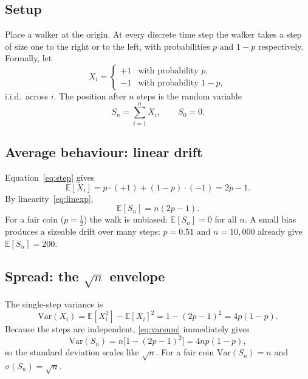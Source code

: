 \documentclass[conference,a4paper,10pt]{IEEEtran}
\begin{document}
\subsection{Setup}
Place a walker at the origin. At every discrete time step the walker takes
a step of size one to the right or to the left, with probabilities
$p$ and $1-p$ respectively. Formally, let
\begin{equation}
X_{i}=
\begin{cases}
+1 & \text{with probability } p, \\
-1 & \text{with probability } 1-p,
\end{cases}
\label{eq:step}
\end{equation}
i.i.d.\ across $i$. The position after $n$ steps is the random variable
\begin{equation}
S_{n}=\sum_{i=1}^{n}X_{i},\qquad S_{0}=0.
\label{eq:Sn}
\end{equation}

\subsection{Average behaviour: linear drift}
Equation~\eqref{eq:step} gives
\begin{equation}
\mathbb{E}[X_{i}]=p\cdot(+1)+(1-p)\cdot(-1)=2p-1.
\label{eq:Estep}
\end{equation}
By linearity~\eqref{eq:linexp},
\begin{equation}
\mathbb{E}[S_{n}]=n(2p-1).
\label{eq:ESn}
\end{equation}
For a fair coin ($p=\tfrac{1}{2}$) the walk is unbiased: $\mathbb{E}[S_{n}]
=0$ for all $n$. A small bias produces a sizeable drift over many steps:
$p=0.51$ and $n=10{,}000$ already give $\mathbb{E}[S_{n}]=200$.

\subsection{Spread: the \texorpdfstring{$\sqrt{n}$}{sqrt(n)} envelope}
The single-step variance is
\begin{equation}
\mathrm{Var}(X_{i})
=\mathbb{E}[X_{i}^{2}]-\mathbb{E}[X_{i}]^{2}
=1-(2p-1)^{2}=4p(1-p).
\end{equation}
Because the steps are independent, \eqref{eq:varsum} immediately gives
\begin{equation}
\mathrm{Var}(S_{n})=n\bigl[1-(2p-1)^{2}\bigr]=4np(1-p),
\label{eq:VarSn}
\end{equation}
so the standard deviation scales like $\sqrt{n}$. For a fair coin
$\mathrm{Var}(S_{n})=n$ and $\sigma(S_{n})=\sqrt{n}$.
\end{document}
